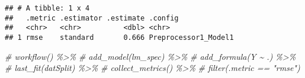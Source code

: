 \documentclass[
]{article}
\newenvironment{Shaded}{\begin{snugshade}}{\end{snugshade}}
\newcommand{\CommentTok}[1]{\textcolor[rgb]{0.56,0.35,0.01}{\textit{#1}}}
\begin{document}
\begin{verbatim}
## # A tibble: 1 x 4
##   .metric .estimator .estimate .config             
##   <chr>   <chr>          <dbl> <chr>               
## 1 rmse    standard       0.666 Preprocessor1_Model1
\end{verbatim}

\begin{Shaded}
\begin{Highlighting}[]
\CommentTok{\# workflow() \%\textgreater{}\%}
\CommentTok{\#   add\_model(lm\_spec) \%\textgreater{}\%}
\CommentTok{\#   add\_formula(Y \textasciitilde{} .) \%\textgreater{}\%}
\CommentTok{\#   last\_fit(datSplit) \%\textgreater{}\% }
\CommentTok{\#   collect\_metrics() \%\textgreater{}\%}
\CommentTok{\#   filter(.metric == "rmse")}
\end{Highlighting}
\end{Shaded}
\end{document}
